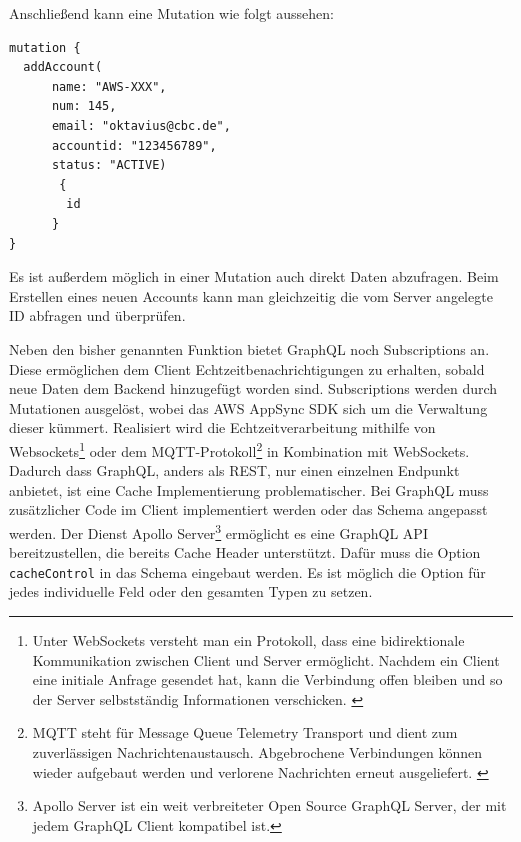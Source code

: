 Anschließend kann eine Mutation wie folgt aussehen:

\begin{lstlisting}[basicstyle=\ttfamily, breaklines=true , frame = single, backgroundcolor=\color{lightgray} ]
mutation {
  addAccount(
      name: "AWS-XXX",
      num: 145,
      email: "oktavius@cbc.de",
      accountid: "123456789",
      status: "ACTIVE)
       {
        id
      }
}
\end{lstlisting}

Es ist außerdem möglich in einer Mutation auch direkt Daten abzufragen. Beim Erstellen eines neuen Accounts kann man gleichzeitig die
vom Server angelegte ID abfragen und überprüfen.\cite[]{GraphQL1}

Neben den bisher genannten Funktion bietet GraphQL noch Subscriptions an.
Diese ermöglichen dem Client Echtzeitbenachrichtigungen zu erhalten, sobald neue Daten dem Backend hinzugefügt worden sind.
Subscriptions werden durch Mutationen ausgelöst, wobei das AWS AppSync SDK sich um die Verwaltung dieser kümmert.
Realisiert wird die Echtzeitverarbeitung mithilfe von Websockets\footnote{Unter WebSockets versteht man ein Protokoll, dass eine bidirektionale Kommunikation zwischen Client und Server ermöglicht. Nachdem ein Client eine initiale Anfrage gesendet hat, kann die Verbindung offen bleiben und so der Server selbstständig Informationen verschicken. \cite[]{Websockets}}
oder dem MQTT-Protokoll\footnote{MQTT steht für Message Queue Telemetry Transport und dient zum zuverlässigen Nachrichtenaustausch. Abgebrochene Verbindungen können wieder aufgebaut werden und verlorene Nachrichten erneut ausgeliefert. \cite[]{MQTT} } in Kombination mit WebSockets. \cite[]{GraphQLSubs}
Dadurch dass GraphQL, anders als REST, nur einen einzelnen Endpunkt anbietet, ist eine Cache Implementierung problematischer.
Bei GraphQL muss zusätzlicher Code im Client implementiert werden oder das Schema angepasst werden.
Der Dienst Apollo Server\footnote{Apollo Server ist ein weit verbreiteter Open Source GraphQL Server, der mit jedem GraphQL Client kompatibel ist.} ermöglicht es
eine GraphQL API bereitzustellen, die bereits Cache Header unterstützt.
Dafür muss die Option \verb+cacheControl+ in das Schema eingebaut werden.
Es ist möglich die Option für jedes individuelle Feld oder den gesamten Typen zu setzen. \cite[]{Apollo}
\cite[]{GraphQL} \cite[]{GraphQL1}


